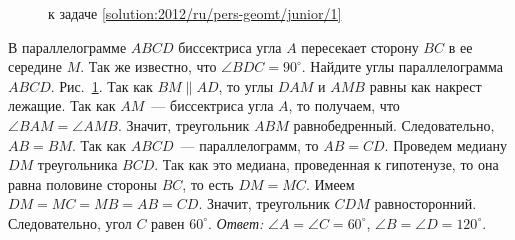 \ifsolution
\begin{figure}\centering
    \caption{к задаче \ref{solution:2012/ru/pers-geomt/junior/1}}
    \label{fig:solution:2012/ru/pers-geomt/junior/1}
\end{figure}
\fi %

\problem
В параллелограмме $ABCD$ биссектриса угла $A$ пересекает сторону $BC$ в ее
середине $M$.
Так же известно, что $\angle BDC = 90^\circ$.
Найдите углы параллелограмма $ABCD$.
\solution
\label{solution:2012/ru/pers-geomt/junior/1}%
Рис.~\ref{fig:solution:2012/ru/pers-geomt/junior/1}.
Так как $BM \parallel AD$, то углы $DAM$ и $AMB$ равны как накрест лежащие.
Так как $AM$~--- биссектриса угла $A$, то получаем, что
$\angle BAM = \angle AMB$.
Значит, треугольник $ABM$ равнобедренный.
Следовательно, $AB = BM$.
Так как $ABCD$~--- параллелограмм, то $AB = CD$.
Проведем медиану $DM$ треугольника $BCD$.
Так как это медиана, проведенная к гипотенузе, то она равна половине стороны
$BC$, то есть $DM = MC$.
Имеем $DM = MC = MB = AB = CD$.
Значит, треугольник $CDM$ равносторонний.
Следовательно, угол $C$ равен $60^\circ$.
\emph{Ответ:}
$\angle A = \angle C = 60^\circ$,
$\angle B = \angle D = 120^\circ$.
\endproblem
